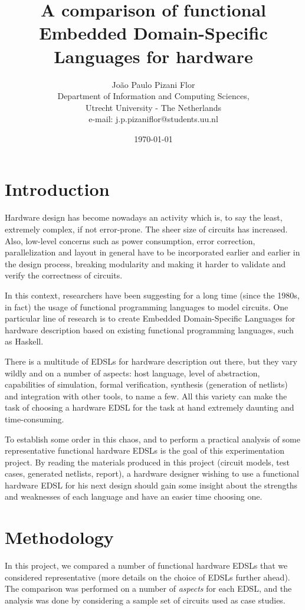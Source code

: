 \documentclass[a4paper]{article}
\title{A comparison of functional Embedded Domain-Specific Languages for hardware}
\date{\today}
\author
{
    João Paulo Pizani Flor \\
    Department of Information and Computing Sciences, \\
    Utrecht University - The Netherlands \\
    e-mail: j.p.pizaniflor@students.uu.nl
}
\begin{document}
    \maketitle

    \section{Introduction}
    \label{sec:intro}
        Hardware design has become nowadays an activity which is, to say the least, extremely
        complex, if not error-prone. The sheer size of circuits has increased. Also, low-level
        concerns such as power consumption, error correction, parallelization and layout
        in general have to be incorporated earlier and earlier in the design process, breaking
        modularity and making it harder to validate and verify the correctness of circuits.

        In this context, researchers have been suggesting for a long time (since the 1980s, in
        fact) the usage of functional programming languages to model circuits. One particular line
        of research is to create Embedded Domain-Specific Languages for hardware description based
        on existing functional programming languages, such as Haskell.

        There is a multitude of EDSLs for hardware description out there, but they vary wildly and
        on a number of aspects: host language, level of abstraction, capabilities of simulation,
        formal verification, synthesis (generation of netlists) and integration with other tools, to
        name a few. All this variety can make the task of choosing a hardware EDSL for the task at
        hand extremely daunting and time-consuming.

        To establish some order in this chaos, and to perform a practical analysis of some
        representative functional hardware EDSLs is the goal of this experimentation project. By
        reading the materials produced in this project (circuit models, test cases, generated
        netlists, report), a hardware designer wishing to use a functional hardware EDSL for his
        next design should gain some insight about the strengths and weaknesses of each language and
        have an easier time choosing one.

    \section{Methodology}
    \label{sec:methods}
        In this project, we compared a number of functional hardware EDSLs that we considered
        representative (more details on the choice of EDSLs further ahead). The comparison was
        performed on a number of \emph{aspects} for each EDSL, and the analysis was done by
        considering a sample set of circuits used as case studies.
\end{document}
